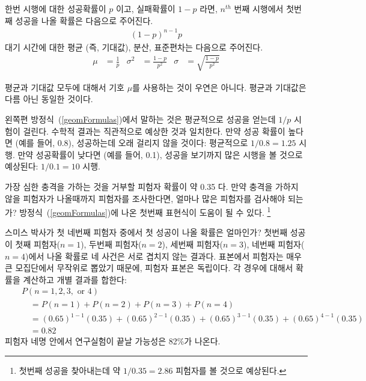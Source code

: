 \begin{termBox}{
한번 시행에 대한 성공확률이 $p$ 이고, 실패확률이 $1-p$ 라면, $n^{th}$ 번째 시행에서 첫번째 성공을 나올 확률은 다음으로 주어진다.\vspace{-1.5mm}
\begin{eqnarray}
(1-p)^{n-1}p
\end{eqnarray}
대기 시간에 대한 평균 (즉, 기대값), 분산, 표준편차는 다음으로 주어진다.\vspace{-2.5mm}
\begin{align}
\mu &= \frac{1}{p}
	&\sigma^2&=\frac{1-p}{p^2}
	&\sigma &= \sqrt{\frac{1-p}{p^2}}
\label{geomFormulas}
\end{align}}
\end{termBox}

평균과 기대값 모두에 대해서 기호 $\mu$를 사용하는 것이 우연은 아니다. 평균과 기대값은 다름 아닌 동일한 것이다.

왼쪽편 방정식~(\ref{geomFormulas})에서 말하는 것은 평균적으로 성공을 얻는데 $1/p$ 시험이 걸린다. 수학적 결과는 직관적으로 예상한 것과 일치한다. 만약 성공 확률이 높다면 (예를 들어, 0.8), 성공하는데 오래 걸리지 않을 것이다: 평균적으로 $1/0.8 = 1.25$ 시행. 만약 성공확률이 낮다면 (예를 들어, 0.1), 성공을 보기까지 많은 시행을 볼 것으로 예상된다: $1/0.1 = 10$ 시행.

\begin{exercise}
가장 심한 충격을 가하는 것을 거부할 피험자 확률이 약 0.35 다. 만약 충격을 가하지 않을 피험자가 나올때까지 피험자를 조사한다면, 얼마나 많은 피험자를 검사해야 되는가? 방정식~(\ref{geomFormulas})에 나온 첫번째 표현식이 도움이 될 수 있다.
\footnote{첫번째 성공을 찾아내는데 약 $1/0.35 = 2.86$ 피험자를 볼 것으로 예상된다.}
\end{exercise}

\begin{example}{
스미스 박사가 첫 네번째 피험자 중에서 첫 성공이 나올 확률은 얼마인가?} \label{marglimFirstSuccessIn4}
첫번째 성공이 첫째 피험자($n=1$), 두번째 피험자($n=2$), 세번째 피험자($n=3$), 네번째 피험자($n=4$)에서 나올 확률로 네 사건은 서로 겹치지 않는 결과다. 표본에서 피험자는 매우 큰 모집단에서 무작위로 뽑았기 때문에, 피험자 표본은 독립이다. 각 경우에 대해서 확률을 계산하고 개별 결과를 합한다:
\begin{eqnarray*}
&&P(n=1, 2, 3,\text{ or }4) \\
	&& \quad = P(n=1)+P(n=2)+P(n=3)+P(n=4) \\
	&& \quad = (0.65)^{1-1}(0.35) + (0.65)^{2-1}(0.35) + (0.65)^{3-1}(0.35) + (0.65)^{4-1}(0.35) \\
	&& \quad = 0.82
\end{eqnarray*}
피험자 네명 안에서 연구실험이 끝날 가능성은 82\%가 나온다.
\end{example}

